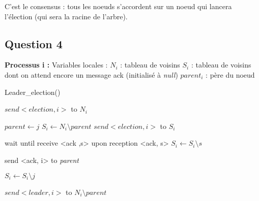 \documentclass[paper=a4, fontsize=11pt]{article} %
\begin{document}
C'est le consensus : tous les noeuds s'accordent sur un noeud qui lancera l'élection (qui sera la racine de l'arbre).


\subsection{Question 4}

\textbf{Processus i :}
\newline
Variables locales : 
\newline
$ N_{i} $ : tableau de voisins 
\newline
$ S_{i} $ : tableau de voisins dont on attend encore un message ack (initialisé à \textit{null})
\newline
$ parent_{i} $ : père du noeud
\newline
\begin{algorithm}[H]
   \caption{Leader\_election()}
    \begin{algorithmic}[1]


      \Comment{}
			\State $ send <election, i>$ to $ N_{i}$
		\EndIf
       \EndFunction


      \Comment{}
			\State $parent \gets j$
			\State $ S_{i} \gets N_{i} \setminus parent $
			\State $ send <election, i>$ to $ S_{i}$

				\State  wait until receive <ack ,s>
				\State   upon reception <ack, s> 
				\State $ S_{i} \gets S_{i}\setminus s $ 
			\EndWhile

		\EndIf
		\State  send <ack, i> to \textit{parent}
       \EndFunction


      \Comment{}
			\State $ S_{i} \gets S_{i}\setminus j $ 
       \EndFunction



      \Comment{}
			\State $ send <leader, i> $ to $  N_{i} \setminus \textit{parent} $
       \EndFunction
\end{algorithmic}
\end{algorithm}
\end{document}
